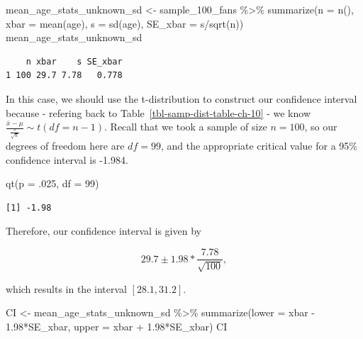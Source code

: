 \documentclass[
  letterpaper,
  DIV=11,
  numbers=noendperiod]{scrreprt}
\newenvironment{Shaded}{\begin{snugshade}}{\end{snugshade}}
\newcommand{\AttributeTok}[1]{\textcolor[rgb]{0.40,0.45,0.13}{#1}}
\newcommand{\DecValTok}[1]{\textcolor[rgb]{0.68,0.00,0.00}{#1}}
\newcommand{\FloatTok}[1]{\textcolor[rgb]{0.68,0.00,0.00}{#1}}
\newcommand{\FunctionTok}[1]{\textcolor[rgb]{0.28,0.35,0.67}{#1}}
\newcommand{\NormalTok}[1]{\textcolor[rgb]{0.00,0.23,0.31}{#1}}
\newcommand{\OtherTok}[1]{\textcolor[rgb]{0.00,0.23,0.31}{#1}}
\newcommand{\SpecialCharTok}[1]{\textcolor[rgb]{0.37,0.37,0.37}{#1}}
\theoremstyle{definition}
\theoremstyle{remark}
\begin{document}
\begin{Shaded}
\begin{Highlighting}[]
\NormalTok{mean\_age\_stats\_unknown\_sd }\OtherTok{\textless{}{-}}\NormalTok{ sample\_100\_fans }\SpecialCharTok{\%\textgreater{}\%} 
  \FunctionTok{summarize}\NormalTok{(}\AttributeTok{n =} \FunctionTok{n}\NormalTok{(),}
            \AttributeTok{xbar =} \FunctionTok{mean}\NormalTok{(age),}
            \AttributeTok{s =} \FunctionTok{sd}\NormalTok{(age),}
            \AttributeTok{SE\_xbar =}\NormalTok{ s}\SpecialCharTok{/}\FunctionTok{sqrt}\NormalTok{(n))}
\NormalTok{mean\_age\_stats\_unknown\_sd}
\end{Highlighting}
\end{Shaded}

\begin{verbatim}
    n xbar    s SE_xbar
1 100 29.7 7.78   0.778
\end{verbatim}

In this case, we should use the t-distribution to construct our
confidence interval because - refering back to
Table~\ref{tbl-samp-dist-table-ch-10} - we know
\(\frac{\bar{x} - \mu}{\frac{s}{\sqrt{n}}} \sim t(df = n-1)\). Recall
that we took a sample of size \(n = 100\), so our degrees of freedom
here are \(df = 99\), and the appropriate critical value for a 95\%
confidence interval is -1.984.

\begin{Shaded}
\begin{Highlighting}[]
\FunctionTok{qt}\NormalTok{(}\AttributeTok{p =}\NormalTok{ .}\DecValTok{025}\NormalTok{, }\AttributeTok{df =} \DecValTok{99}\NormalTok{)}
\end{Highlighting}
\end{Shaded}

\begin{verbatim}
[1] -1.98
\end{verbatim}

Therefore, our confidence interval is given by

\[29.7 \pm 1.98*\frac{7.78}{\sqrt{100}},\]

which results in the interval \([28.1, 31.2]\).

\begin{Shaded}
\begin{Highlighting}[]
\NormalTok{CI }\OtherTok{\textless{}{-}}\NormalTok{ mean\_age\_stats\_unknown\_sd }\SpecialCharTok{\%\textgreater{}\%} 
  \FunctionTok{summarize}\NormalTok{(}\AttributeTok{lower =}\NormalTok{ xbar }\SpecialCharTok{{-}} \FloatTok{1.98}\SpecialCharTok{*}\NormalTok{SE\_xbar,}
            \AttributeTok{upper =}\NormalTok{ xbar }\SpecialCharTok{+} \FloatTok{1.98}\SpecialCharTok{*}\NormalTok{SE\_xbar)}
\NormalTok{CI}
\end{Highlighting}
\end{Shaded}
\end{document}
